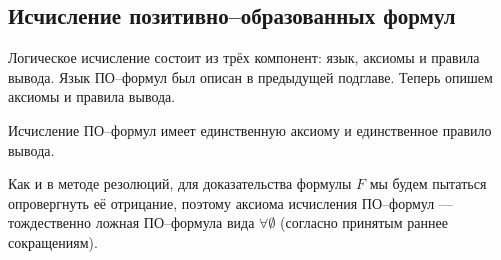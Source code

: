 






\subsection{Исчисление позитивно--образованных формул}
Логическое исчисление состоит из трёх компонент: язык, аксиомы и правила вывода. Язык ПО--формул был описан в предыдущей подглаве. Теперь опишем аксиомы и правила вывода.

Исчисление ПО--формул имеет единственную аксиому и единственное правило вывода.

Как и в методе резолюций, для доказательства формулы $F$ мы будем пытаться опровергнуть её отрицание, поэтому аксиома исчисления ПО--формул --- тождественно ложная ПО--формула вида $\forall \emptyset$ (согласно принятым раннее сокращениям). %

